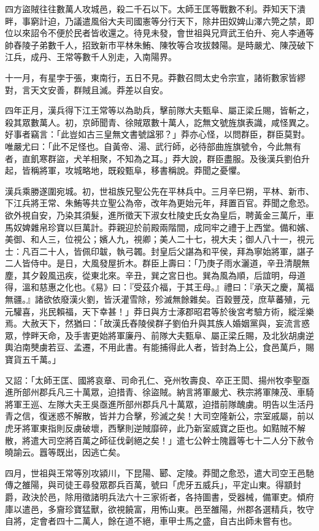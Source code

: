 \begin{pinyinscope}
四方盜賊往往數萬人攻城邑，殺二千石以下。太師王匡等戰數不利。莽知天下潰畔，事窮計迫，乃議遣風俗大夫司國憲等分行天下，除井田奴婢山澤六筦之禁，即位以來詔令不便於民者皆收還之。待見未發，會世祖與兄齊武王伯升、宛人李通等帥舂陵子弟數千人，招致新巿平林朱鮪、陳牧等合攻拔棘陽。是時嚴尤、陳茂破下江兵，成丹、王常等數千人別走，入南陽界。

十一月，有星孛于張，東南行，五日不見。莽數召問太史令宗宣，諸術數家皆繆對，言天文安善，群賊且滅。莽差以自安。

四年正月，漢兵得下江王常等以為助兵，擊前隊大夫甄阜、屬正梁丘賜，皆斬之，殺其眾數萬人。初，京師聞青、徐賊眾數十萬人，訖無文號旌旗表識，咸怪異之。好事者竊言：「此豈如古三皇無文書號諡邪？」莽亦心怪，以問群臣，群臣莫對。唯嚴尤曰：「此不足怪也。自黃帝、湯、武行師，必待部曲旌旗號令，今此無有者，直飢寒群盜，犬羊相聚，不知為之耳。」莽大說，群臣盡服。及後漢兵劉伯升起，皆稱將軍，攻城略地，既殺甄阜，移書稱說。莽聞之憂懼。

漢兵乘勝遂圍宛城。初，世祖族兄聖公先在平林兵中。三月辛巳朔，平林、新巿、下江兵將王常、朱鮪等共立聖公為帝，改年為更始元年，拜置百官。莽聞之愈恐。欲外視自安，乃染其須髮，進所徵天下淑女杜陵史氏女為皇后，聘黃金三萬斤，車馬奴婢雜帛珍寶以巨萬計。莽親迎於前殿兩階間，成同牢之禮于上西堂。備和嬪、美御、和人三，位視公；嬪人九，視卿；美人二十七，視大夫；御人八十一，視元士：凡百二十人，皆佩印韍，執弓韣。封皇后父諶為和平侯，拜為寧始將軍，諶子二人皆侍中。是日，大風發屋折木。群臣上壽曰：「乃庚子雨水灑道，辛丑清靚無塵，其夕穀風迅疾，從東北來。辛丑，巽之宮日也。巽為風為順，后誼明，母道得，溫和慈惠之化也。《易》曰：『受茲介福，于其王母。』禮曰：『承天之慶，萬福無疆。』諸欲依廢漢火劉，皆沃灌雪除，殄滅無餘雜矣。百穀豐茂，庶草蕃殖，元元驩喜，兆民賴福，天下幸甚！」莽日與方士涿郡昭君等於後宮考驗方術，縱淫樂焉。大赦天下，然猶曰：「故漢氏舂陵侯群子劉伯升與其族人婚姻黨與，妄流言惑眾，悖畔天命，及手害更始將軍廉丹、前隊大夫甄阜、屬正梁丘賜，及北狄胡虜逆輿泊南僰虜若豆、孟遷，不用此書。有能捕得此人者，皆封為上公，食邑萬戶，賜寶貨五千萬。」

又詔：「太師王匡、國將哀章、司命孔仁、兗州牧壽良、卒正王閎、揚州牧李聖亟進所部州郡兵凡三十萬眾，迫措青、徐盜賊。納言將軍嚴尤、秩宗將軍陳茂、車騎將軍王巡、左隊大夫王吳亟進所部州郡兵凡十萬眾，迫措前隊醜虜。明告以生活丹青之信，復迷惑不解散，皆并力合擊，殄滅之矣！大司空隆新公，宗室戚屬，前以虎牙將軍東指則反虜破壞，西擊則逆賊靡碎，此乃新室威寶之臣也。如黠賊不解散，將遣大司空將百萬之師征伐劋絕之矣！」遣七公幹士隗囂等七十二人分下赦令曉諭云。囂等既出，因逃亡矣。

四月，世祖與王常等別攻潁川，下昆陽、郾、定陵。莽聞之愈恐，遣大司空王邑馳傳之雒陽，與司徒王尋發眾郡兵百萬，號曰「虎牙五威兵」，平定山東。得顓封爵，政決於邑，除用徵諸明兵法六十三家術者，各持圖書，受器械，備軍吏。傾府庫以遣邑，多齎珍寶猛獸，欲視饒富，用怖山東。邑至雒陽，州郡各選精兵，牧守自將，定會者四十二萬人，餘在道不絕，車甲士馬之盛，自古出師未嘗有也。


\end{pinyinscope}
